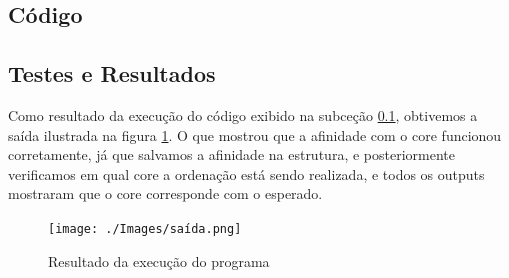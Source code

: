 \documentclass{article}
\begin{document}
\subsection{Código}
\label{sub-sec-cod}


\subsection{Testes e Resultados}
Como resultado da execução do código exibido na subceção \ref{sub-sec-cod}, obtivemos a saída ilustrada na figura \ref{fig:exec}. O que mostrou que a afinidade com o core funcionou corretamente, já que salvamos a afinidade na estrutura, e posteriormente verificamos em qual core a ordenação está sendo realizada, e todos os outputs mostraram que o core corresponde com o esperado.

\begin{figure}[ht]
    \centering
    \texttt{[image: ./Images/saída.png]}
    \caption{Resultado da execução do programa}
    \label{fig:exec}
\end{figure}

\printbibliography %
\end{document}
